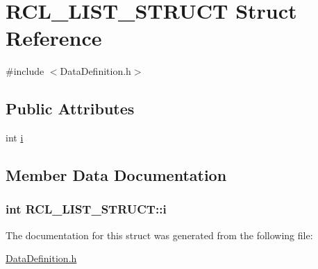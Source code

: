\hypertarget{structRCL__LIST__STRUCT}{\section{R\-C\-L\-\_\-\-L\-I\-S\-T\-\_\-\-S\-T\-R\-U\-C\-T Struct Reference}
\label{structRCL__LIST__STRUCT}
}


{\ttfamily \#include $<$Data\-Definition.\-h$>$}

\subsection*{Public Attributes}
\begin{DoxyCompactItemize}
\item 
int \hyperlink{structRCL__LIST__STRUCT_a1fe9da973a851dad04eb6b0272b35adb}{i}
\end{DoxyCompactItemize}


\subsection{Member Data Documentation}
\hypertarget{structRCL__LIST__STRUCT_a1fe9da973a851dad04eb6b0272b35adb}{
\subsubsection[{i}]{\setlength{\rightskip}{0pt plus 5cm}int R\-C\-L\-\_\-\-L\-I\-S\-T\-\_\-\-S\-T\-R\-U\-C\-T\-::i}}\label{structRCL__LIST__STRUCT_a1fe9da973a851dad04eb6b0272b35adb}


The documentation for this struct was generated from the following file\-:\begin{DoxyCompactItemize}
\item 
\hyperlink{DataDefinition_8h}{Data\-Definition.\-h}\end{DoxyCompactItemize}
